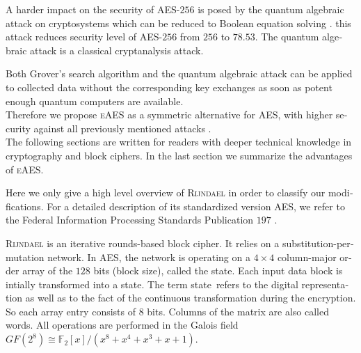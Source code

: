\documentclass[a4paper,11pt]{article}
\begin{document}
\begin{otherlanguage}{english}
\begin{multicols}{2}
\noindent
A harder impact on the security of \textsc{AES}-$256$ is posed by the quantum algebraic attack on cryptosystems which can be reduced to Boolean equation solving \cite{QAA}. this attack reduces security level of \textsc{AES}-$256$ from $256$ to $78.53$. The quantum algebraic attack is a classical cryptanalysis attack.

\noindent
Both Grover's search algorithm and the quantum algebraic attack can be applied to collected data without the corresponding key exchanges as soon as potent enough quantum computers are available. \\

\noindent
Therefore we propose \textsc{eAES} as a symmetric alternative for \textsc{AES}, with higher security against all previously mentioned attacks \cite{HFE,WEI,CRK,GRO,QAA}.\\

\noindent
The following sections are written for readers with deeper technical knowledge in cryptography and block ciphers. In the last section we summarize the advantages of \textsc{eAES}. 

\vspace{0.1cm}

\noindent
Here we only give a high level overview of \textsc{Rijndael} in order to classify our modifications. For a detailed description of its standardized version \textsc{AES}, we refer to the Federal Information Processing Standards Publication $197$ \cite{AES}. 

\noindent
\textsc{Rijndael} is an iterative rounds-based block cipher. It relies on a substitution-permutation network. In \textsc{AES}, the network is operating on a $4 \times 4$ column-major order array of the $128$ bits (block size), called the \glqq state\grqq. Each input data block is intially transformed into a \glqq state\grqq. The term \glqq state\grqq \, refers to the digital representation as well as to the fact of the continuous transformation during the encryption. So each array entry consists of $8$ bits. Columns of the matrix are also called \glqq words\grqq. All operations are performed in the Galois field $GF (2^8) \cong \mathbb{F}_2 [x]/(x^8 + x^4 + x^3 + x + 1 )$.



\end{multicols}
\end{otherlanguage}
\end{document}
